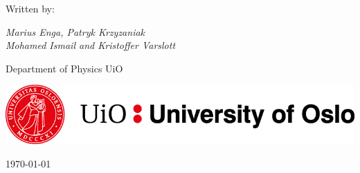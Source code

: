 \documentclass[twoside,onecolumn]{article}
\begin{document}
\begin{titlepage}
    
    \large Written by:
	
	\vspace{0.5\baselineskip} %
	
	\textit{ Marius Enga, Patryk Krzyzaniak\\ Mohamed Ismail and Kristoffer Varslott \\} %
	
	\vspace{0.5\baselineskip} %
	
	\bigskip
	
	Department of Physics UiO %
	
	\bigskip
	\bigskip
	\bigskip
	\bigskip
	\bigskip
	\bigskip
	\bigskip
	\graphicspath{{Pictures/}} %
	\includegraphics[scale = 0.7]{University.png}
	\vfill %
	
	\bigskip
	\bigskip
	
	
	\bigskip
	\bigskip
	\bigskip
	\bigskip
	\vspace{0.3\baselineskip} %
	
	\today

\end{titlepage}




\end{document}
